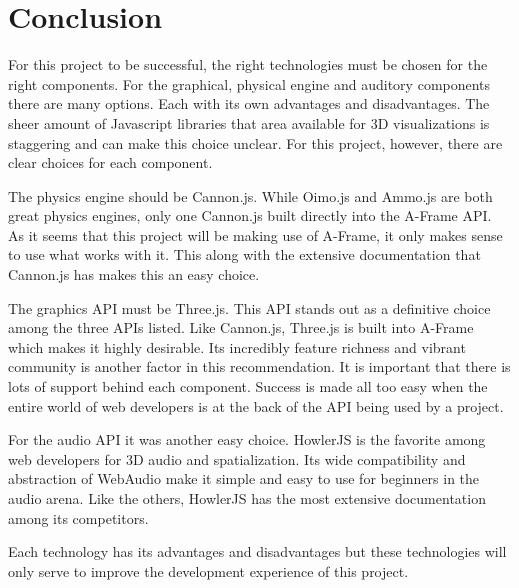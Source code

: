 \section{Conclusion}
For this project to be successful, the right technologies must be chosen for the right components. For the graphical, physical engine and auditory components there are many options. Each with its own advantages and disadvantages. The sheer amount of Javascript libraries that area available for 3D visualizations is staggering and can make this choice unclear. For this project, however, there are clear choices for each component.

The physics engine should be Cannon.js. While Oimo.js and Ammo.js are both great physics engines, only one Cannon.js built directly into the A-Frame API. As it seems that this project will be making use of A-Frame, it only makes sense to use what works with it. This along with the extensive documentation that Cannon.js has makes this an easy choice.

The graphics API must be Three.js. This API stands out as a definitive choice among the three APIs listed. Like Cannon.js, Three.js is built into A-Frame which makes it highly desirable. Its incredibly feature richness and vibrant community is another factor in this recommendation. It is important that there is lots of support behind each component. Success is made all too easy when the entire world of web developers is at the back of the API being used by a project.

For the audio API it was another easy choice. HowlerJS is the favorite among web developers for 3D audio and spatialization. Its wide compatibility and abstraction of WebAudio make it simple and easy to use for beginners in the audio arena. Like the others, HowlerJS has the most extensive documentation among its competitors.

Each technology has its advantages and disadvantages but these technologies will only serve to improve the development experience of this project.


